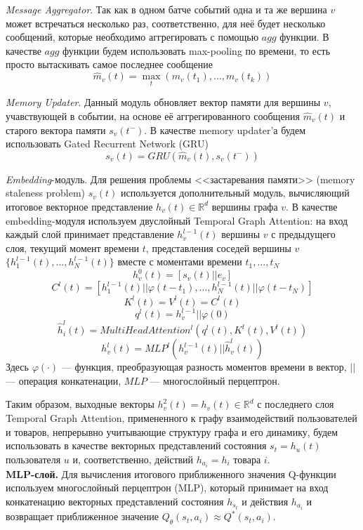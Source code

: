 \documentclass[a4paper,14pt,oneside]{mipt-thesis-ms}
\renewcommand{\phi}{\varphi}  %
\begin{document}
{\it Message Aggregator}. Так как в одном батче событий одна и та же вершина $v$ может встречаться несколько раз, соответственно, для неё будет несколько сообщений, которые необходимо аггрегировать с помощью $agg$ функции. В качестве $agg$ функции будем использовать max-pooling по времени, то есть просто вытаскивать самое последнее сообщение
$$\hat m_v(t) = \max_t(m_v(t_1), \dots, m_v(t_k))$$

{\it Memory Updater}. Данный модуль обновляет вектор памяти для вершины $v$, учавствующей в событии, на основе её аггрегированного сообщения $\hat m_v(t)$ и старого вектора памяти $s_v(t^-)$. В качестве memory updater'а будем использовать Gated Recurrent Network (GRU)
$$s_v(t) = GRU(\hat m_v(t), s_v(t^-))$$

{\it Embedding}-модуль. Для решения проблемы <<застаревания памяти>> (memory staleness problem) $s_v(t)$ используется дополнительный модуль, вычисляющий итоговое векторное представление $h_v(t) \in \mathbb{R}^d$ вершины графа $v$. В качестве embedding-модуля используем двуслойный Temporal Graph Attention: на вход каждый слой принимает представление $h_v^{l-1}(t)$ вершины $v$ с предыдущего слоя, текущий момент времени $t$, представления соседей вершины $v$ $\{h_1^{l-1}(t), \dots, h_N^{l-1}(t)\}$ вместе с моментами времени $t_1, \dots, t_N$
$$h_v^0(t) = [s_v(t) || e_v]$$
$$C^l(t) = [h_1^{l-1}(t)||\phi(t - t_1), \dots, h_N^{l-1}(t)||\phi(t - t_N)]$$
$$K^l(t) = V^l(t) = C^l(t)$$
$$q^l(t) = h_v^{l-1} || \phi(0)$$
$$\hat h_i^l(t) = MultiHeadAttention^l(q^l(t), K^l(t), V^l(t))$$
$$h_v^l(t) = MLP^l(h_v^{l-1}(t) || \hat h_v^l(t))$$
Здесь $\phi(\cdot)$ --- функция, преобразующая разность моментов времени в вектор, $||$ --- операция конкатенации, $MLP$ --- многослойный перцептрон.

Таким образом, выходные векторы $h_v^2(t) = h_v(t) \in \mathbb{R}^d$ с последнего слоя Temporal Graph Attention, примененного к графу взаимодействий пользователей и товаров, непрерывно учитывающие структуру графа и его динамику, будем использовать в качестве векторных представлений состояния $s_t = h_u(t)$ пользователя $u$ и, соответственно, действий $h_{a_i} = h_i$ товара $i$.\\

{\bf MLP-слой.} Для вычисления итогового приближенного значения Q-функции используем многослойный перцептрон (MLP), который принимает на вход конкатенацию векторных представлений состояния $h_{s_t}$ и действия $h_{a_i}$ и возвращает приближенное значение $Q_{\theta}(s_t, a_i) \approx Q^*(s_t, a_i)$.\\
\end{document}
